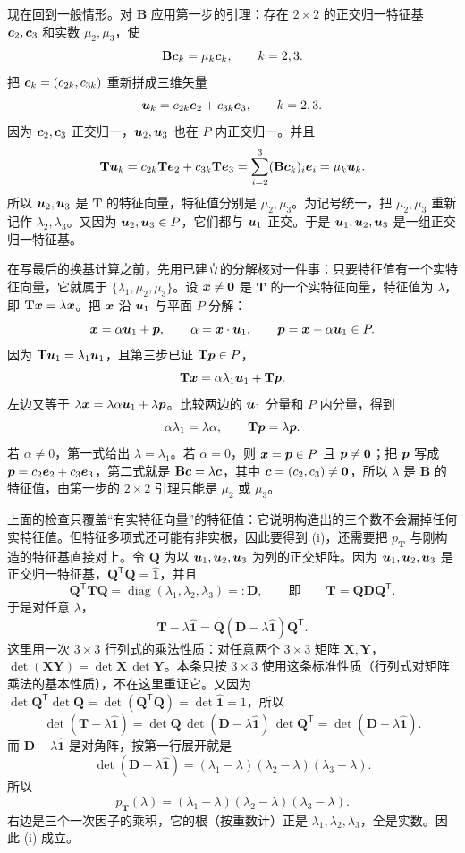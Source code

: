 \documentclass[11pt]{ctexart}
\newcommand{\ten}[1]{\mathbf{#1}}
\newcommand{\unitd}{\hat{\ten{1}}}
\begin{document}
现在回到一般情形。对 $\ten B$ 应用第一步的引理：存在 $2\times2$ 的正交归一特征基 $\boldsymbol{c}_2,\boldsymbol{c}_3$ 和实数 $\mu_2,\mu_3$，使
\[
\ten B\vect c_k=\mu_k\vect c_k,\qquad k=2,3 .
\]
把 $\boldsymbol{c}_k=(c_{2k},c_{3k})$ 重新拼成三维矢量
\[
\boldsymbol{u}_k=c_{2k}\boldsymbol{e}_2+c_{3k}\boldsymbol{e}_3,\qquad k=2,3 .
\]
因为 $\boldsymbol{c}_2,\boldsymbol{c}_3$ 正交归一，$\boldsymbol{u}_2,\boldsymbol{u}_3$ 也在 $P$ 内正交归一。并且
\[
\ten T\vect u_k
=c_{2k}\ten T\vect e_2+c_{3k}\ten T\vect e_3
=\sum_{i=2}^{3}(\ten B\vect c_k)_i\vect e_i
=\mu_k\vect u_k .
\]
所以 $\boldsymbol{u}_2,\boldsymbol{u}_3$ 是 $\ten T$ 的特征向量，特征值分别是 $\mu_2,\mu_3$。为记号统一，把 $\mu_2,\mu_3$ 重新记作 $\lambda_2,\lambda_3$。又因为 $\boldsymbol{u}_2,\boldsymbol{u}_3\in P$，它们都与 $\boldsymbol{u}_1$ 正交。于是 $\boldsymbol{u}_1,\boldsymbol{u}_2,\boldsymbol{u}_3$ 是一组正交归一特征基。

在写最后的换基计算之前，先用已建立的分解核对一件事：只要特征值有一个实特征向量，它就属于 $\{\lambda_1,\mu_2,\mu_3\}$。设 $\boldsymbol{x}\ne\boldsymbol{0}$ 是 $\ten T$ 的一个实特征向量，特征值为 $\lambda$，即 $\ten T\vect x=\lambda\vect x$。把 $\boldsymbol{x}$ 沿 $\boldsymbol{u}_1$ 与平面 $P$ 分解：
\[
\boldsymbol{x}=\alpha\boldsymbol{u}_1+\boldsymbol{p},\qquad
\alpha=\boldsymbol{x}\cdot\boldsymbol{u}_1,\qquad
\boldsymbol{p}=\boldsymbol{x}-\alpha\boldsymbol{u}_1\in P .
\]
因为 $\ten T\vect u_1=\lambda_1\vect u_1$，且第三步已证 $\ten T\vect p\in P$，
\[
\ten T\vect x=\alpha\lambda_1\vect u_1+\ten T\vect p .
\]
左边又等于 $\lambda\boldsymbol{x}=\lambda\alpha\boldsymbol{u}_1+\lambda\boldsymbol{p}$。比较两边的 $\boldsymbol{u}_1$ 分量和 $P$ 内分量，得到
\[
\alpha\lambda_1=\lambda\alpha,\qquad
\ten T\vect p=\lambda\vect p .
\]
若 $\alpha\ne0$，第一式给出 $\lambda=\lambda_1$。若 $\alpha=0$，则 $\boldsymbol{x}=\boldsymbol{p}\in P$ 且 $\boldsymbol{p}\ne\boldsymbol{0}$；把 $\boldsymbol{p}$ 写成 $\boldsymbol{p}=c_2\boldsymbol{e}_2+c_3\boldsymbol{e}_3$，第二式就是 $\ten B\vect c=\lambda\vect c$，其中 $\boldsymbol{c}=(c_2,c_3)\ne\boldsymbol{0}$，所以 $\lambda$ 是 $\ten B$ 的特征值，由第一步的 $2\times2$ 引理只能是 $\mu_2$ 或 $\mu_3$。

上面的检查只覆盖“有实特征向量”的特征值：它说明构造出的三个数不会漏掉任何实特征值。但特征多项式还可能有非实根，因此要得到 (i)，还需要把 $p_{\ten T}$ 与刚构造的特征基直接对上。令 $\ten Q$ 为以 $\boldsymbol{u}_1,\boldsymbol{u}_2,\boldsymbol{u}_3$ 为列的正交矩阵。因为 $\boldsymbol{u}_1,\boldsymbol{u}_2,\boldsymbol{u}_3$ 是正交归一特征基，$\ten Q^{\mathsf T}\ten Q=\unitd$，并且
\[
\ten Q^{\mathsf T}\ten T\ten Q
=\operatorname{diag}(\lambda_1,\lambda_2,\lambda_3)=:\ten D,
\qquad\text{即}\qquad
\ten T=\ten Q\ten D\ten Q^{\mathsf T}.
\]
于是对任意 $\lambda$，
\[
\ten T-\lambda\unitd=\ten Q(\ten D-\lambda\unitd)\ten Q^{\mathsf T}.
\]
这里用一次 $3\times3$ 行列式的乘法性质：对任意两个 $3\times3$ 矩阵 $\ten X,\ten Y$，$\det(\ten X\ten Y)=\det\ten X\,\det\ten Y$。本条只按 $3\times3$ 使用这条标准性质（行列式对矩阵乘法的基本性质），不在这里重证它。又因为 $\det\ten Q^{\mathsf T}\det\ten Q=\det(\ten Q^{\mathsf T}\ten Q)=\det\unitd=1$，所以
\[
\det(\ten T-\lambda\unitd)
=\det\ten Q\,\det(\ten D-\lambda\unitd)\,\det\ten Q^{\mathsf T}
=\det(\ten D-\lambda\unitd).
\]
而 $\ten D-\lambda\unitd$ 是对角阵，按第一行展开就是
\[
\det(\ten D-\lambda\unitd)
=(\lambda_1-\lambda)(\lambda_2-\lambda)(\lambda_3-\lambda).
\]
所以
\[
p_{\ten T}(\lambda)=(\lambda_1-\lambda)(\lambda_2-\lambda)(\lambda_3-\lambda).
\]
右边是三个一次因子的乘积，它的根（按重数计）正是 $\lambda_1,\lambda_2,\lambda_3$，全是实数。因此 (i) 成立。
\end{document}
